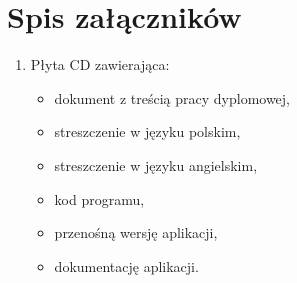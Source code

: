 \documentclass[a4paper,11pt,twoside]{report}
\theoremstyle{definition}
\begin{document}
\thispagestyle{empty}

\listoffigures
\thispagestyle{empty}


\renewcommand{\listtablename}{Spis tabel}
\listoftables
\thispagestyle{empty}



\chapter*{Spis załączników}
\begin{enumerate}
\item Płyta CD zawierająca:
\begin{itemize}
	\item dokument z treścią pracy dyplomowej,
	\item streszczenie w języku polskim,
	\item streszczenie w języku angielskim,
	\item kod programu,
	\item przenośną wersję aplikacji,
	\item dokumentację aplikacji.
\end{itemize}
\end{enumerate}
\thispagestyle{empty}
\end{document}
